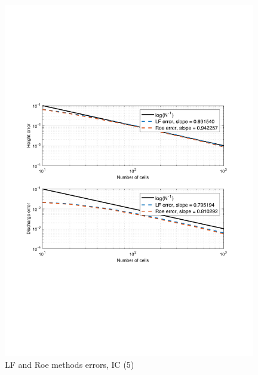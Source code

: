 \documentclass[11pt,a4paper]{article}
\begin{document}
\begin{figure}[!htb]
    \centering
    \includegraphics[width=11cm]{pictures/IC_2_error.pdf}
    \caption{LF and Roe methods errors, IC (5)}
    \label{fig:IC_2_errors}
\end{figure}
\end{document}
